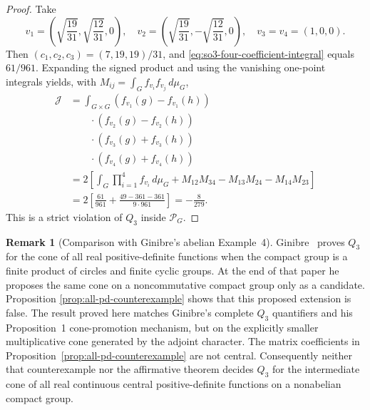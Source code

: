 \documentclass[11pt,reqno]{amsart}
\theoremstyle{plain}
\theoremstyle{definition}
\newtheorem{remark}[theorem]{Remark}
\begin{document}
\begin{proof}
Take
\[
 v_1=\left(\sqrt{\frac{19}{31}},\sqrt{\frac{12}{31}},0\right),
 \quad
 v_2=\left(\sqrt{\frac{19}{31}},-\sqrt{\frac{12}{31}},0\right),
 \quad
 v_3=v_4=(1,0,0).
\]
Then $(c_1,c_2,c_3)=(7,19,19)/31$, and
\eqref{eq:so3-four-coefficient-integral} equals $61/961$.  Expanding the
signed product and using the vanishing one-point integrals yields, with
$M_{ij}=\int_G f_{v_i}f_{v_j}\,d\mu_G$,
\[
\begin{aligned}
 \mathcal J&=\int_{G\times G}
 (f_{v_1}(g)-f_{v_1}(h))\\
 &\qquad{}\cdot(f_{v_2}(g)-f_{v_2}(h))\\
 &\qquad{}\cdot(f_{v_3}(g)+f_{v_3}(h))\\
 &\qquad{}\cdot(f_{v_4}(g)+f_{v_4}(h))\\
 &=2\left[\int_G\prod_{i=1}^4f_{v_i}\,d\mu_G
 +M_{12}M_{34}-M_{13}M_{24}-M_{14}M_{23}\right]\\
 &=2\left[\frac{61}{961}
  +\frac{49-361-361}{9\cdot961}\right]
 =-\frac8{279}.
\end{aligned}
\]
This is a strict violation of $Q_3$ inside $\mathcal P_G$.
\end{proof}

\begin{remark}[Comparison with Ginibre's abelian Example~4]
\label{rem:ginibre-example4-comparison}
Ginibre~\cite[Example~4]{Ginibre1970} proves $Q_3$ for the cone of all real
positive-definite functions when the compact group is a finite product of
circles and finite cyclic groups.  At the end of that paper he proposes the
same cone on a noncommutative compact group only as a candidate.  Proposition
\ref{prop:all-pd-counterexample} shows that this proposed extension is false.
The result proved here matches Ginibre's complete $Q_3$ quantifiers and his
Proposition~1 cone-promotion mechanism, but on the explicitly smaller
multiplicative cone generated by the adjoint character.
The matrix coefficients in Proposition~\ref{prop:all-pd-counterexample} are
not central.  Consequently neither that counterexample nor the affirmative
theorem decides $Q_3$ for the intermediate cone of all real continuous
central positive-definite functions on a nonabelian compact group.
\end{remark}
\end{document}
